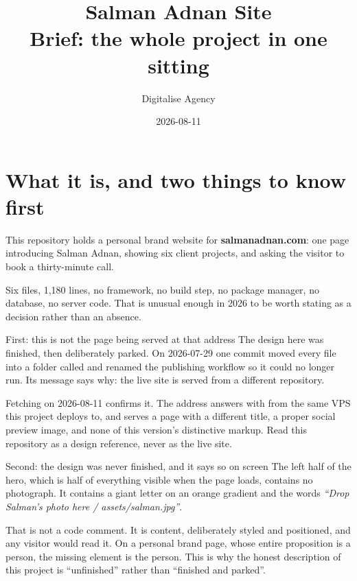 \documentclass[11pt,a4paper]{article}
\title{Salman Adnan Site\\[2mm]\large Brief: the whole project in one sitting}
\author{Digitalise Agency}
\date{2026-08-11}
\begin{document}
\maketitle
\tableofcontents
\newpage

\section{What it is, and two things to know first}

This repository holds a personal brand website for \textbf{salmanadnan.com}: one
page introducing Salman Adnan, showing six client projects, and asking the visitor
to book a thirty-minute call.

Six files, 1{,}180 lines, no framework, no build step, no package manager, no
database, no server code. That is unusual enough in 2026 to be worth stating as a
decision rather than an absence.

\begin{keyidea}{First: this is not the page being served at that address}
The design here was finished, then deliberately parked. On 2026-07-29 one commit
moved every file into a folder called  and renamed the
publishing workflow so it could no longer run. Its message says why: the live site
is served from a different repository.

Fetching  on 2026-08-11 confirms it. The address
answers with  from the same VPS this project deploys to, and serves a
page with a different title, a proper social preview image, and none of this
version's distinctive markup. Read this repository as a design reference, never as
the live site.
\end{keyidea}

\begin{keyidea}{Second: the design was never finished, and it says so on screen}
The left half of the hero, which is half of everything visible when the page loads,
contains no photograph. It contains a giant letter  on an orange gradient
and the words \emph{``Drop Salman's photo here / assets/salman.jpg''}.

That is not a code comment. It is content, deliberately styled and positioned, and
any visitor would read it. On a personal brand page, whose entire proposition is a
person, the missing element is the person. This is why the honest description of
this project is ``unfinished'' rather than ``finished and parked''.
\end{keyidea}
\end{document}
